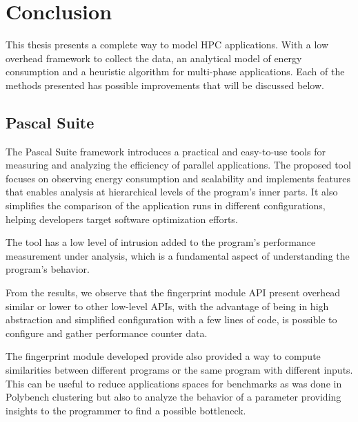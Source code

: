 \section{Conclusion} 

This thesis presents a complete way to model HPC applications. With a low overhead framework to collect the data, an analytical model of energy consumption and a heuristic algorithm for multi-phase applications. Each of the methods presented has possible improvements that will be discussed below.


\subsection{Pascal Suite} \label{sec:conclusions_pascal}

The Pascal Suite framework introduces a practical and easy-to-use tools for measuring and analyzing the efficiency of parallel applications. The proposed tool focuses on observing energy consumption and scalability and implements features that enables analysis at hierarchical levels of the program's inner parts. It also simplifies the comparison of the application runs in different configurations, helping developers target software optimization efforts.

The tool has a low level of intrusion added to the program's performance measurement under analysis, which is a fundamental aspect of understanding the program's behavior.

From the results, we observe that the fingerprint module API present overhead similar or lower to other low-level APIs, with the advantage of being in high abstraction and simplified configuration with a few lines of code, is possible to configure and gather performance counter data.

The fingerprint module developed provide also provided a way to compute similarities between different programs or the same program with different inputs. This can be useful to reduce applications spaces for benchmarks as was done in Polybench clustering but also to analyze the behavior of a parameter providing insights to the programmer to find a possible bottleneck.


